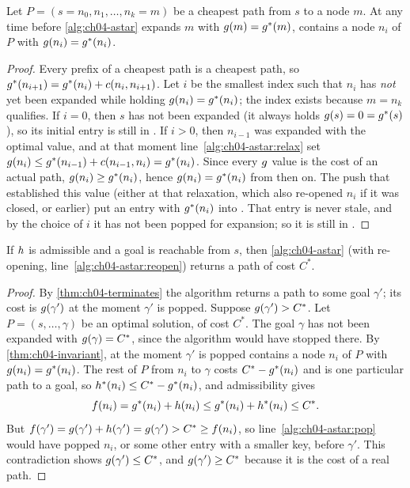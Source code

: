 \begin{lemma}
\label{thm:ch04-invariant}
Let $P = (s = n_0, n_1, \dots, n_k = m)$ be a cheapest path from $s$ to a node
$m$. At any time before \cref{alg:ch04-astar} expands $m$ with
$g(m) = g^*(m)$, \Open contains a node $n_i$ of $P$ with
$g(n_i) = g^*(n_i)$.
\end{lemma}
\begin{proof}
Every prefix of a cheapest path is a cheapest path, so
$g^*(n_{i+1}) = g^*(n_i) + c(n_i, n_{i+1})$. Let $i$ be the smallest
index such that $n_i$ has \emph{not} yet been expanded while holding
$g(n_i) = g^*(n_i)$; the index exists because $m = n_k$ qualifies. If
$i = 0$, then $s$ has not been expanded (it always holds $g(s) = 0 =
g^*(s)$), so its initial entry is still in \Open. If $i > 0$, then
$n_{i-1}$ was expanded with the optimal value, and at that moment
line~\ref{alg:ch04-astar:relax} set $g(n_i) \le g^*(n_{i-1}) +
c(n_{i-1}, n_i) = g^*(n_i)$. Since every $g$ value is the cost of an
actual path, $g(n_i) \ge g^*(n_i)$, hence $g(n_i) =
g^*(n_i)$ from then on. The push that established this value (either at
that relaxation, which also re-opened $n_i$ if it was closed, or earlier) put an
entry with $g^*(n_i)$ into \Open. That entry is never stale, and by the
choice of $i$ it has not been popped for expansion; so it is still in \Open.
\end{proof}

\begin{theorem}
\label{thm:ch04-optimal}
If $h$ is admissible and a goal is reachable from $s$, then
\cref{alg:ch04-astar} (with re-opening, line~\ref{alg:ch04-astar:reopen})
returns a path of cost $C^*$.
\end{theorem}
\begin{proof}
By \cref{thm:ch04-terminates} the algorithm returns a path to some goal
$\gamma'$; its cost is $g(\gamma')$ at the moment $\gamma'$ is popped.
Suppose $g(\gamma') > C^*$. Let $P = (s, \dots, \gamma)$ be an optimal
solution, of cost $C^*$. The goal $\gamma$ has not been expanded with
$g(\gamma) = C^*$, since the algorithm would have stopped there. By
\cref{thm:ch04-invariant}, at the moment $\gamma'$ is popped \Open contains a
node $n_i$ of $P$ with $g(n_i) = g^*(n_i)$. The rest of $P$ from $n_i$
to $\gamma$ costs $C^* - g^*(n_i)$ and is one particular path to a goal,
so $h^*(n_i) \le C^* - g^*(n_i)$, and admissibility gives
\[
  f(n_i) = g^*(n_i) + h(n_i)
             \le g^*(n_i) + h^*(n_i) \le C^*.
\]
But $f(\gamma') = g(\gamma') + h(\gamma') = g(\gamma') >
C^* \ge f(n_i)$, so line~\ref{alg:ch04-astar:pop} would have popped
$n_i$, or some other entry with a smaller key, before $\gamma'$. This
contradiction shows $g(\gamma') \le C^*$, and $g(\gamma') \ge C^*$
because it is the cost of a real path.
\end{proof}

